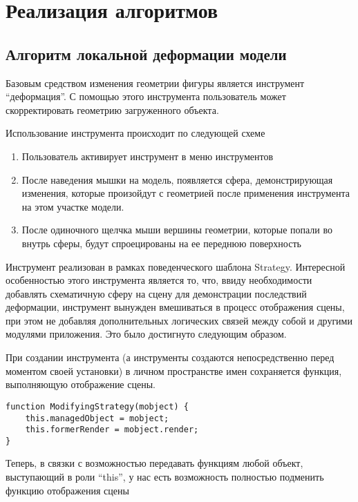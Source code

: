 \section{Реализация алгоритмов}

\subsection{Алгоритм локальной деформации модели}

Базовым средством изменения геометрии фигуры является инструмент ``деформация''.
С помощью этого инструмента пользователь может скорректировать геометрию
загруженного объекта.

Использование инструмента происходит по следующей схеме

\begin{enumerate}
    \item Пользователь активирует инструмент в меню инструментов
    \item После наведения мышки на модель, появляется сфера, демонстрирующая
    изменения, которые произойдут с геометрией после применения инструмента на
    этом участке модели.
    \item После одиночного щелчка мыши вершины геометрии, которые попали во
    внутрь сферы, будут спроецированы на ее переднюю поверхность
\end{enumerate}

Инструмент реализован в рамках поведенческого шаблона Strategy. Интересной
особенностью этого инструмента является то, что, ввиду необходимости добавлять
схематичную сферу на сцену для демонстрации последствий деформации, инструмент
вынужден вмешиваться в процесс отображения сцены, при этом не добавляя
дополнительных логических связей между собой и другими модулями приложения. Это
было достигнуто следующим образом.

При создании инструмента (а инструменты создаются непосредственно перед моментом
своей установки) в личном пространстве имен сохраняется функция,
выполняющую отображение сцены.

\begin{lstlisting}
function ModifyingStrategy(mobject) {
    this.managedObject = mobject;
    this.formerRender = mobject.render;
}
\end{lstlisting}

Теперь, в связки с возможностью передавать функциям любой объект,
выступающий в роли ``this'', у нас есть возможность полностью подменить функцию
отображения сцены

